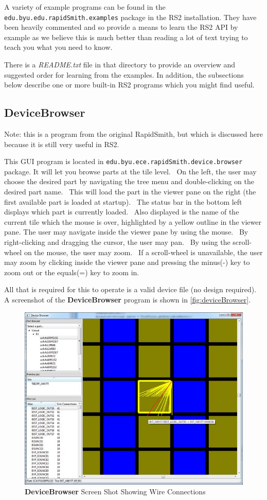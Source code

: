 \documentclass[12pt]{article}
\newcommand{\fil}[1]{{\em #1}}
\newcommand{\pkg}[1]{{\texttt{#1}}}
\newcommand{\pgm}[1]{{\textbf{#1}}}
\begin{document}
A variety of example programs can be found in the
\pkg{edu.byu.edu.rapidSmith.examples} package in the RS2 installation.
They have been heavily commented and so provide a means to learn the RS2 API by
example as we believe this is much better than reading a lot of text trying to
teach you what you need to know.

There is a \fil{README.txt} file in that directory to provide an overview and
suggested order for learning from the examples.
In addition, the subsections below describe one or more built-in RS2 programs
which you might find useful.

\subsection{\pgm{DeviceBrowser}}
Note: this is a program from the original RapidSmith, but which is discussed
here because it is still very useful in RS2. 

This GUI program is located in \pkg{edu.byu.ece.rapidSmith.device.browser}
package.  It will let you browse parts at the tile level.  On the left, the user
may choose the desired part by navigating the tree menu and double-clicking on
the desired part name.  This will load the part in the viewer pane on the right
(the first available part is loaded at startup).  The status bar in the bottom
left displays which part is currently loaded.  Also displayed is the name of the
current tile which the mouse is over, highlighted by a yellow outline in the
viewer pane. The user may navigate inside the viewer pane by using the mouse.
 By right-clicking and dragging the cursor, the user may pan.  By using the
scroll-wheel on the mouse, the user may zoom.  If a scroll-wheel is unavailable,
the user may zoom by clicking inside the viewer pane and pressing the minus(-)
key to zoom out or the equals(=) key to zoom in.

All that is required for this to operate is a valid device file (no design
required). A screenshot of the \pgm{DeviceBrowser} program is shown in
\autoref{fig:deviceBrowser}.

\begin{figure}[htb]
\centering
\includegraphics[width=0.8\columnwidth]{deviceBrowser2}
\caption{\pgm{DeviceBrowser} Screen Shot Showing Wire Connections}
\label{fig:deviceBrowser2}
\end{figure}
\end{document}
